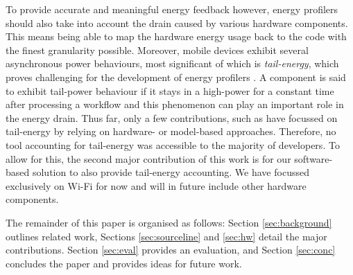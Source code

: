 To provide accurate and meaningful energy feedback however, energy 
profilers should also take into account the drain caused by various 
hardware components. This means being able to map the hardware energy 
usage back to the code with the finest granularity possible. Moreover, 
mobile devices exhibit several asynchronous power behaviours, most 
significant of which is \textit{tail-energy}, which proves challenging 
for the development of energy profilers 
\cite{pathak2012energy,li2013calculating}. A component is said to 
exhibit tail-power behaviour if it stays in a high-power for a constant 
time after processing a workflow and this phenomenon can play an 
important role in the energy drain. Thus far, only a few contributions, 
such as \eprof{} \cite{pathak2012energy} have focussed on tail-energy by 
relying on hardware- or model-based approaches. Therefore, no tool 
accounting for tail-energy was accessible to the majority of developers. 
To allow for this, the second major contribution of this work is for our 
software-based solution to also provide tail-energy accounting. We have 
focussed exclusively on Wi-Fi for now and will in future include other 
hardware components.

The remainder of this paper is organised as follows: Section 
\ref{sec:background} outlines related work, Sections 
\ref{sec:sourceline} and \ref{sec:hw} detail the major contributions. 
Section \ref{sec:eval} provides an evaluation, and Section 
\ref{sec:conc} concludes the paper and provides ideas for future work.

